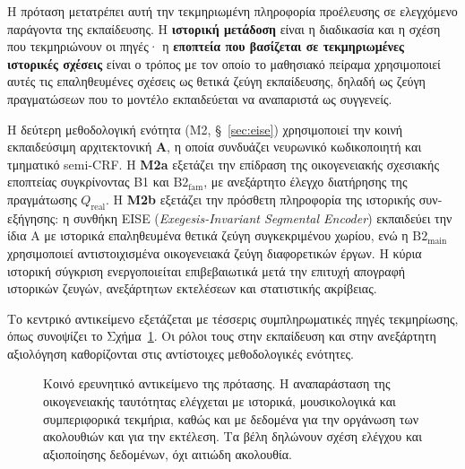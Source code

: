 \documentclass[11pt,a4paper]{article}
\begin{document}
Η πρόταση μετατρέπει αυτή την τεκμηριωμένη πληροφορία προέλευσης σε ελεγχόμενο παράγοντα της εκπαίδευσης. Η \textbf{ιστορική μετάδοση} είναι η διαδικασία και η σχέση που τεκμηριώνουν οι πηγές· η \textbf{εποπτεία που βασίζεται σε τεκμηριωμένες ιστορικές σχέσεις} είναι ο τρόπος με τον οποίο το μαθησιακό πείραμα χρησιμοποιεί αυτές τις επαληθευμένες σχέσεις ως θετικά ζεύγη εκπαίδευσης, δηλαδή ως ζεύγη πραγματώσεων που το μοντέλο εκπαιδεύεται να αναπαριστά ως συγγενείς.

Η δεύτερη μεθοδολογική ενότητα (M2, §~\ref{sec:eise}) χρησιμοποιεί την κοινή εκπαιδεύσιμη αρχιτεκτονική \textbf{A}, η οποία συνδυάζει νευρωνικό κωδικοποιητή και τμηματικό semi-CRF. Η \textbf{Μ2a} εξετάζει την επίδραση της οικογενειακής σχεσιακής εποπτείας συγκρίνοντας B1 και $\mathrm{B2}_{\mathrm{fam}}$, με ανεξάρτητο έλεγχο διατήρησης της πραγμάτωσης $Q_{\mathrm{real}}$. Η \textbf{Μ2b} εξετάζει την πρόσθετη πληροφορία της ιστορικής συν-εξήγησης: η συνθήκη EISE (\emph{Exegesis-Invariant Segmental Encoder}) εκπαιδεύει την ίδια A με ιστορικά επαληθευμένα θετικά ζεύγη συγκεκριμένου χωρίου, ενώ η $\mathrm{B2}_{\mathrm{main}}$ χρησιμοποιεί αντιστοιχισμένα οικογενειακά ζεύγη διαφορετικών έργων. Η κύρια ιστορική σύγκριση ενεργοποιείται επιβεβαιωτικά μετά την επιτυχή απογραφή ιστορικών ζευγών, ανεξάρτητων εκτελέσεων και στατιστικής ακρίβειας.

Το κεντρικό αντικείμενο εξετάζεται με τέσσερις συμπληρωματικές πηγές τεκμηρίωσης, όπως συνοψίζει το Σχήμα~\ref{fig:conceptual-v865}. Οι ρόλοι τους στην εκπαίδευση και στην ανεξάρτητη αξιολόγηση καθορίζονται στις αντίστοιχες μεθοδολογικές ενότητες.

\begin{figure}[htbp]
\centering
{}
\caption{Κοινό ερευνητικό αντικείμενο της πρότασης. Η αναπαράσταση της οικογενειακής ταυτότητας ελέγχεται με ιστορικά, μουσικολογικά και συμπεριφορικά τεκμήρια, καθώς και με δεδομένα για την οργάνωση των ακολουθιών και για την εκτέλεση. Τα βέλη δηλώνουν σχέση ελέγχου και αξιοποίησης δεδομένων, όχι αιτιώδη ακολουθία.}
\label{fig:conceptual-v865}
\end{figure}
\FloatBarrier
\end{document}
